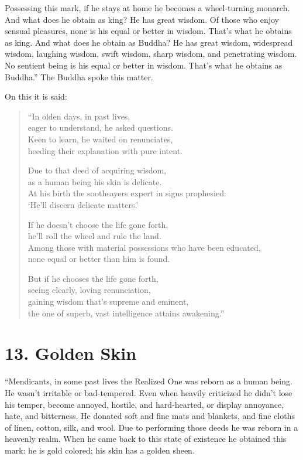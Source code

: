 \documentclass[12pt,openany]{book}%
\begin{document}
Possessing this mark, if he stays at home he becomes a wheel-turning monarch. And what does he obtain as king? He has great wisdom. Of those who enjoy sensual pleasures, none is his equal or better in wisdom. That’s what he obtains as king. And what does he obtain as Buddha? He has great wisdom, widespread wisdom, laughing wisdom, swift wisdom, sharp wisdom, and penetrating wisdom. No sentient being is his equal or better in wisdom. That’s what he obtains as Buddha.” The Buddha spoke this matter. 

On this it is said: 

\begin{verse}%
“In olden days, in past lives, \\
eager to understand, he asked questions. \\
Keen to learn, he waited on renunciates, \\
heeding their explanation with pure intent. 

Due to that deed of acquiring wisdom, \\
as a human being his skin is delicate. \\
At his birth the soothsayers expert in signs prophesied: \\
‘He’ll discern delicate matters.’ 

If he doesn’t choose the life gone forth, \\
he’ll roll the wheel and rule the land. \\
Among those with material possessions who have been educated, \\
none equal or better than him is found. 

But if he chooses the life gone forth, \\
seeing clearly, loving renunciation, \\
gaining wisdom that’s supreme and eminent, \\
the one of superb, vast intelligence attains awakening.” 

%
\end{verse}

\section*{13. Golden Skin }

“Mendicants, in some past lives the Realized One was reborn as a human being. He wasn’t irritable or bad-tempered. Even when heavily criticized he didn’t lose his temper, become annoyed, hostile, and hard-hearted, or display annoyance, hate, and bitterness. He donated soft and fine mats and blankets, and fine cloths of linen, cotton, silk, and wool. Due to performing those deeds he was reborn in a heavenly realm. When he came back to this state of existence he obtained this mark: he is gold colored; his skin has a golden sheen. 
\end{document}

